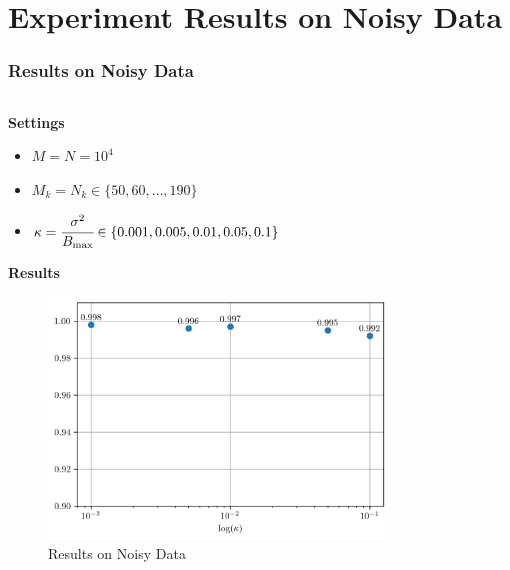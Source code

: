 \documentclass{beamer}
\begin{document}
\section{Experiment Results on Noisy Data}
\begin{frame}
    \frametitle{Results on Noisy Data}
    \begin{columns}
        \begin{column}{0.5\textwidth}
            \textbf{Settings}
            \scriptsize
            \begin{itemize}
                \item $M = N = 10^4$
                \item $M_k = N_k \in \{50, 60, \dots, 190\}$
                \item $\kappa = \cfrac{\sigma^2}{B_{\max}} \in \{0.001 , 0.005, 0.01, 0.05, 0.1\}$
            \end{itemize}
            \textbf{Results}
            \begin{figure}[htb]
                \centering
                \includegraphics[width=\linewidth]{result.png}
                \caption{Results on Noisy Data}
                \label{fig:results}
            \end{figure}
        \end{column}
        \begin{column}{0.5\textwidth}
            \vspace{-1cm}
            \centering
            \begin{figure}[htb]
                \centering
                \begin{subfigure}[b]{\textwidth}

\end{subfigure}
\end{figure}
\end{column}
\end{columns}
\end{frame}
\end{document}
